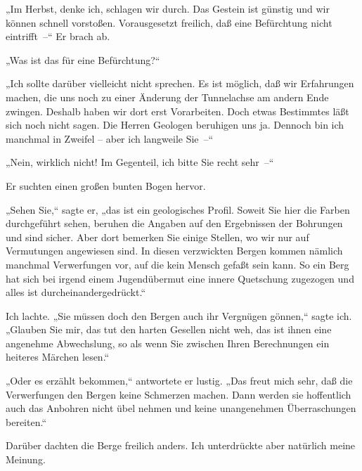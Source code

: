 „Im Herbst, denke ich, schlagen wir durch. Das Gestein ist günstig
und wir können schnell vorstoßen. Vorausgesetzt freilich, daß eine
Befürchtung nicht eintrifft~–“ Er brach ab.

„Was ist das für eine Befürchtung?“

„Ich sollte darüber vielleicht nicht sprechen. Es ist möglich, daß
wir Erfahrungen machen, die uns noch zu einer Änderung der
Tunnelachse am andern Ende zwingen. Deshalb haben wir dort erst
Vorarbeiten. Doch etwas Bestimmtes läßt sich noch nicht sagen. Die
Herren Geologen beruhigen uns ja. Dennoch bin ich manchmal in
Zweifel – aber ich langweile Sie~–“

„Nein, wirklich nicht! Im Gegenteil, ich bitte Sie recht sehr~–“

Er suchten einen großen bunten Bogen hervor.

„Sehen Sie,“ sagte er, „das ist ein geologisches Profil. Soweit Sie
hier die Farben durchgeführt sehen, beruhen die Angaben auf den
Ergebnissen der Bohrungen und sind sicher. Aber dort bemerken Sie
einige Stellen, wo wir nur auf Vermutungen angewiesen sind. In
diesen verzwickten Bergen kommen nämlich manchmal Verwerfungen vor,
auf die kein Mensch gefaßt sein kann. So ein Berg hat sich bei
irgend einem Jugendübermut eine innere Quetschung zugezogen und
alles ist durcheinandergedrückt.“

Ich lachte. „Sie müssen doch den Bergen auch ihr Vergnügen gönnen,“
sagte ich. „Glauben Sie mir, das tut den harten Gesellen nicht weh,
das ist ihnen eine angenehme Abwechslung, so als wenn Sie zwischen
Ihren Berechnungen ein heiteres Märchen lesen.“

„Oder es erzählt bekommen,“ antwortete er lustig. „Das freut mich
sehr, daß die Verwerfungen den Bergen keine Schmerzen machen. Dann
werden sie hoffentlich auch das Anbohren nicht übel nehmen und
keine unangenehmen Überraschungen bereiten.“

Darüber dachten die Berge freilich anders. Ich unterdrückte aber
natürlich meine Meinung.


